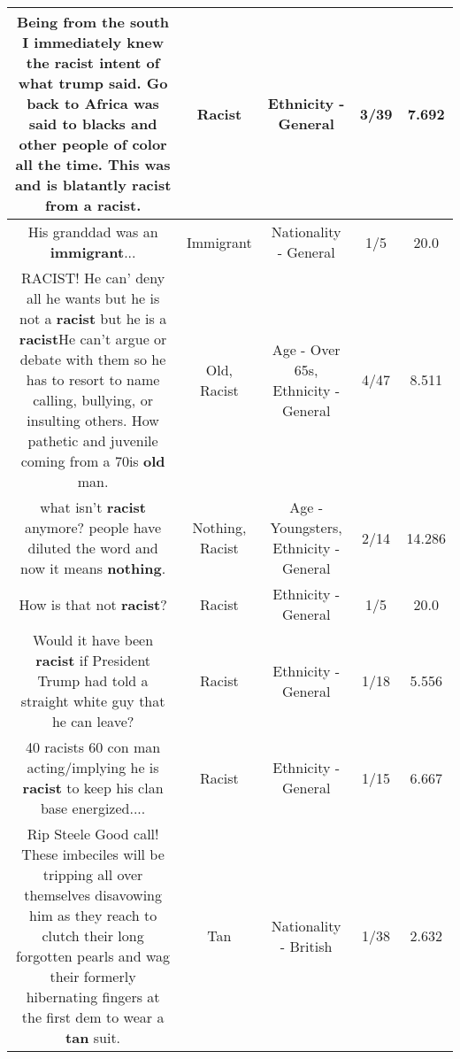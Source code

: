 \documentclass[11pt]{article}
\newlength\mylength
\begin{document}
\begin{center}
\begin{longtable}{|C{.65\mylength}|C{.30\mylength}|C{.12\mylength}|C{.12\mylength}|C{.12\mylength}|}
  \small Being from the south I immediately knew the \textbf{racist} intent of what trump said. Go back to Africa was said to blacks and other people of color all the time. This was and is blatantly \textbf{racist} from a \textbf{racist}.\normalsize   & Racist & Ethnicity - General & 3/39 & 7.692 \\  \hline
  \small His granddad was an \textbf{immigrant}...\normalsize   & Immigrant & Nationality - General & 1/5 & 20.0 \\  \hline
  \small RACIST!  He can' deny all he wants but he is not a \textbf{racist} but he is a \textbf{racist}He can't argue or debate with them so he has to resort to name calling, bullying, or insulting others.  How pathetic and juvenile coming from a 70is \textbf{old} man.\normalsize   & Old, Racist & Age - Over 65s, Ethnicity - General & 4/47 & 8.511 \\  \hline
  \small what isn't \textbf{racist} anymore? people have diluted the word and now it means \textbf{nothing}.\normalsize   & Nothing, Racist & Age - Youngsters, Ethnicity - General & 2/14 & 14.286 \\  \hline
  \small How is that not \textbf{racist}?\normalsize   & Racist & Ethnicity - General & 1/5 & 20.0 \\  \hline
  \small Would it have been \textbf{racist} if President Trump had told a straight white guy that he can leave?\normalsize   & Racist & Ethnicity - General & 1/18 & 5.556 \\  \hline
  \small 40 racists 60 con man acting/implying he is \textbf{racist} to keep his clan base energized....\normalsize   & Racist & Ethnicity - General & 1/15 & 6.667 \\  \hline
  \small Rip Steele Good call! These imbeciles will be tripping all over themselves disavowing him as they reach to clutch their long forgotten pearls and wag their formerly hibernating fingers at the first dem to wear a \textbf{tan} suit.\normalsize   & Tan & Nationality - British & 1/38 & 2.632 \\  \hline

\end{longtable}
\end{center}
\end{document}

